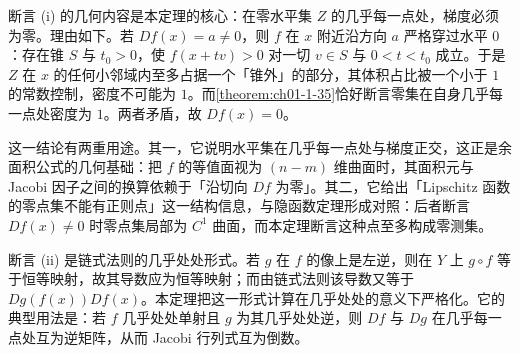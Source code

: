 \documentclass[../../main.tex]{subfiles}%
\begin{document}
\begin{remark}\label{remark:ch03-thm-3-3-动机}
断言 (i) 的几何内容是本定理的核心：在零水平集 $Z$ 的几乎每一点处，梯度必须为零。理由如下。若 $Df(x)=a\neq0$，则 $f$ 在 $x$ 附近沿方向 $a$ 严格穿过水平 $0$：存在锥 $S$ 与 $t_0>0$，使 $f(x+tv)>0$ 对一切 $v\in S$ 与 $0<t<t_0$ 成立。于是 $Z$ 在 $x$ 的任何小邻域内至多占据一个「锥外」的部分，其体积占比被一个小于 $1$ 的常数控制，密度不可能为 $1$。而\cref{theorem:ch01-1-35}恰好断言零集在自身几乎每一点处密度为 $1$。两者矛盾，故 $Df(x)=0$。%

这一结论有两重用途。其一，它说明水平集在几乎每一点处与梯度正交，这正是余面积公式的几何基础：把 $f$ 的等值面视为 $(n-m)$ 维曲面时，其面积元与 Jacobi 因子之间的换算依赖于「沿切向 $Df$ 为零」。其二，它给出「Lipschitz 函数的零点集不能有正则点」这一结构信息，与隐函数定理形成对照：后者断言 $Df(x)\neq0$ 时零点集局部为 $C^1$ 曲面，而本定理断言这种点至多构成零测集。

断言 (ii) 是链式法则的几乎处处形式。若 $g$ 在 $f$ 的像上是左逆，则在 $Y$ 上 $g\circ f$ 等于恒等映射，故其导数应为恒等映射；而由链式法则该导数又等于 $Dg(f(x))Df(x)$。本定理把这一形式计算在几乎处处的意义下严格化。它的典型用法是：若 $f$ 几乎处处单射且 $g$ 为其几乎处处逆，则 $Df$ 与 $Dg$ 在几乎每一点处互为逆矩阵，从而 Jacobi 行列式互为倒数。
\end{remark}
\end{document}
